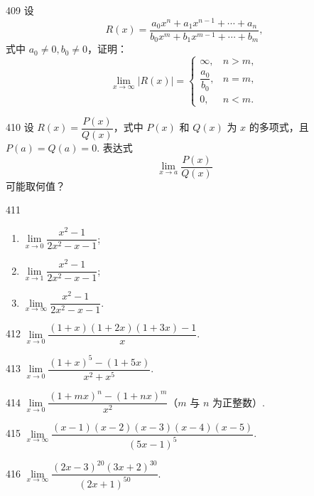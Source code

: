 \begin{prob}[M]{409}
设
\[
R(x) = \frac{a_0 x^n + a_1 x^{n-1} + \cdots + a_n}{b_0 x^m + b_1 x^{m-1} + \cdots + b_m},
\]
式中 $a_0 \neq 0, b_0 \neq 0$，证明：
\[
\lim_{x \to \infty} |R(x)| = \begin{cases}
\infty, & n > m, \\
\dfrac{a_0}{b_0}, & n = m, \\
0, & n < m.
\end{cases}
\]
\end{prob}

\begin{prob}[M]{410}
设 $R(x) = \dfrac{P(x)}{Q(x)}$，式中 $P(x)$ 和 $Q(x)$ 为 $x$ 的多项式，且 $P(a) = Q(a) = 0$. 表达式
\[
\lim_{x \to a} \frac{P(x)}{Q(x)}
\]
可能取何值？
\end{prob}


\begin{prob}[L]{411}
\begin{enumerate}[label=(\alph*), itemsep=2pt, topsep=3pt]
  \item $\lim\limits_{x \to 0} \dfrac{x^2 - 1}{2x^2 - x - 1}$;
  \item $\lim\limits_{x \to 1} \dfrac{x^2 - 1}{2x^2 - x - 1}$;
  \item $\lim\limits_{x \to \infty} \dfrac{x^2 - 1}{2x^2 - x - 1}$.
\end{enumerate}
\end{prob}

\begin{prob}[S]{412}
$\lim\limits_{x \to 0} \dfrac{(1 + x)(1 + 2x)(1 + 3x) - 1}{x}$.
\end{prob}

\begin{prob}[S]{413}
$\lim\limits_{x \to 0} \dfrac{(1 + x)^5 - (1 + 5x)}{x^2 + x^5}$.
\end{prob}

\begin{prob}[S]{414}
$\lim\limits_{x \to 0} \dfrac{(1 + mx)^n - (1 + nx)^m}{x^2}$（$m$ 与 $n$ 为正整数）.
\end{prob}

\begin{prob}[S]{415}
$\lim\limits_{x \to \infty} \dfrac{(x - 1)(x - 2)(x - 3)(x - 4)(x - 5)}{(5x - 1)^5}$.
\end{prob}

\begin{prob}[S]{416}
$\lim\limits_{x \to \infty} \dfrac{(2x - 3)^{20}(3x + 2)^{30}}{(2x + 1)^{50}}$.
\end{prob}

